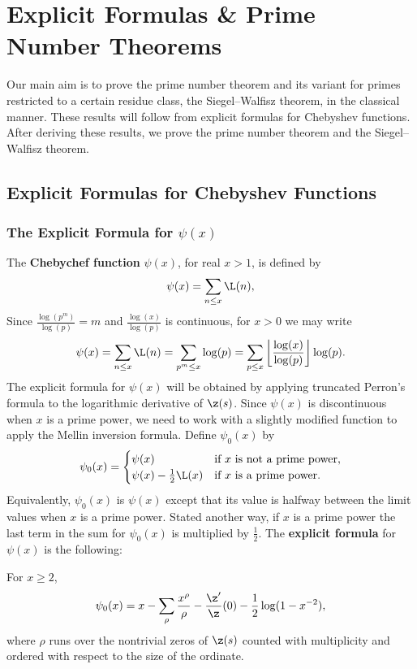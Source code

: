 \chapter{Explicit Formulas \& Prime Number Theorems}
  Our main aim is to prove the prime number theorem and its variant for primes restricted to a certain residue class, the Siegel–Walfisz theorem, in the classical manner. These results will follow from explicit formulas for Chebyshev functions. After deriving these results, we prove the prime number theorem and the Siegel–Walfisz theorem.
  \section{Explicit Formulas for Chebyshev Functions}
    \subsection*{The Explicit Formula for \texorpdfstring{$\psi(x)$}{$\psi(x)$}}
      The \textbf{Chebychef function} $\psi(x)$, for real $x > 1$, is defined by
      \[
        \psi(x) = \sum_{n \le x}\L(n),
      \]
      Since $\frac{\log(p^{m})}{\log(p)} = m$ and $\frac{\log(x)}{\log(p)}$ is continuous, for $x > 0$ we may write
      \begin{equation}\label{equ:alternative_form_for_Chebychef function}
        \psi(x) = \sum_{n \le x}\L(n) = \sum_{p^{m} \le x}\log(p) = \sum_{p \le x}\left\lfloor\frac{\log(x)}{\log(p)}\right\rfloor\log(p).
      \end{equation}
      The explicit formula for $\psi(x)$ will be obtained by applying truncated Perron's formula to the logarithmic derivative of $\z(s)$. Since $\psi(x)$ is discontinuous when $x$ is a prime power, we need to work with a slightly modified function to apply the Mellin inversion formula. Define $\psi_{0}(x)$ by
      \[
        \psi_{0}(x) = \begin{cases} \psi(x) & \text{if $x$ is not a prime power}, \\ \psi(x)-\frac{1}{2}\L(x) & \text{if $x$ is a prime power}. \end{cases}
      \]
      Equivalently, $\psi_{0}(x)$ is $\psi(x)$ except that its value is halfway between the limit values when $x$ is a prime power. Stated another way, if $x$ is a prime power the last term in the sum for $\psi_{0}(x)$ is multiplied by $\frac{1}{2}$. The \textbf{explicit formula} for $\psi(x)$ is the following:

      \begin{theorem}
        For $x \ge 2$,
        \[
          \psi_{0}(x) = x-\sum_{\rho}\frac{x^{\rho}}{\rho}-\frac{\z'}{\z}(0)-\frac{1}{2}\log(1-x^{-2}),
        \]
        where $\rho$ runs over the nontrivial zeros of $\z(s)$ counted with multiplicity and ordered with respect to the size of the ordinate.
      \end{theorem}

